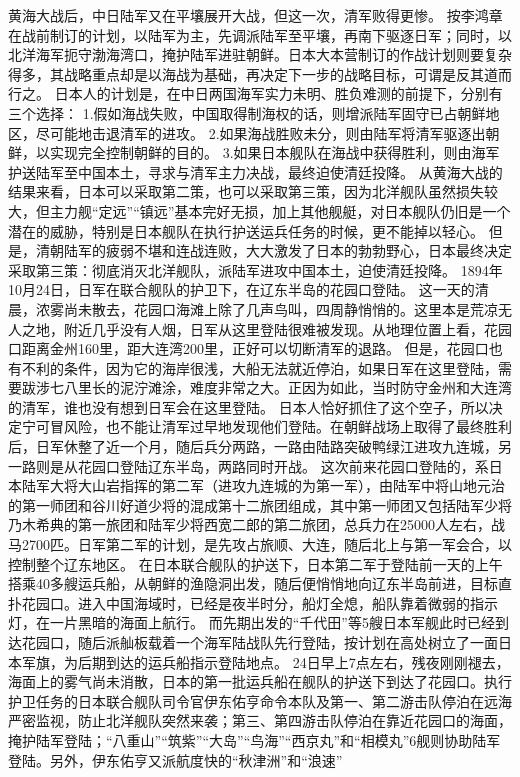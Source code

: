 \documentclass[12pt,UTF8]{ctexbook}
\begin{document}
黄海大战后，中日陆军又在平壤展开大战，但这一次，清军败得更惨。
按李鸿章在战前制订的计划，以陆军为主，先调派陆军至平壤，再南下驱逐日军；同时，以北洋海军扼守渤海湾口，掩护陆军进驻朝鲜。日本大本营制订的作战计划则要复杂得多，其战略重点却是以海战为基础，再决定下一步的战略目标，可谓是反其道而行之。
日本人的计划是，在中日两国海军实力未明、胜负难测的前提下，分别有三个选择：
1.假如海战失败，中国取得制海权的话，则增派陆军固守已占朝鲜地区，尽可能地击退清军的进攻。
2.如果海战胜败未分，则由陆军将清军驱逐出朝鲜，以实现完全控制朝鲜的目的。
3.如果日本舰队在海战中获得胜利，则由海军护送陆军至中国本土，寻求与清军主力决战，最终迫使清廷投降。
从黄海大战的结果来看，日本可以采取第二策，也可以采取第三策，因为北洋舰队虽然损失较大，但主力舰“定远”“镇远”基本完好无损，加上其他舰艇，对日本舰队仍旧是一个潜在的威胁，特别是日本舰队在执行护送运兵任务的时候，更不能掉以轻心。
但是，清朝陆军的疲弱不堪和连战连败，大大激发了日本的勃勃野心，日本最终决定采取第三策：彻底消灭北洋舰队，派陆军进攻中国本土，迫使清廷投降。
1894年10月24日，日军在联合舰队的护卫下，在辽东半岛的花园口登陆。
这一天的清晨，浓雾尚未散去，花园口海滩上除了几声鸟叫，四周静悄悄的。这里本是荒凉无人之地，附近几乎没有人烟，日军从这里登陆很难被发现。从地理位置上看，花园口距离金州160里，距大连湾200里，正好可以切断清军的退路。
但是，花园口也有不利的条件，因为它的海岸很浅，大船无法就近停泊，如果日军在这里登陆，需要跋涉七八里长的泥泞滩涂，难度非常之大。正因为如此，当时防守金州和大连湾的清军，谁也没有想到日军会在这里登陆。
日本人恰好抓住了这个空子，所以决定宁可冒风险，也不能让清军过早地发现他们登陆。在朝鲜战场上取得了最终胜利后，日军休整了近一个月，随后兵分两路，一路由陆路突破鸭绿江进攻九连城，另一路则是从花园口登陆辽东半岛，两路同时开战。
这次前来花园口登陆的，系日本陆军大将大山岩指挥的第二军（进攻九连城的为第一军），由陆军中将山地元治的第一师团和谷川好道少将的混成第十二旅团组成，其中第一师团又包括陆军少将乃木希典的第一旅团和陆军少将西宽二郎的第二旅团，总兵力在25000人左右，战马2700匹。日军第二军的计划，是先攻占旅顺、大连，随后北上与第一军会合，以控制整个辽东地区。
在日本联合舰队的护送下，日本第二军于登陆前一天的上午搭乘40多艘运兵船，从朝鲜的渔隐洞出发，随后便悄悄地向辽东半岛前进，目标直扑花园口。进入中国海域时，已经是夜半时分，船灯全熄，船队靠着微弱的指示灯，在一片黑暗的海面上航行。
而先期出发的“千代田”等5艘日本军舰此时已经到达花园口，随后派舢板载着一个海军陆战队先行登陆，按计划在高处树立了一面日本军旗，为后期到达的运兵船指示登陆地点。
24日早上7点左右，残夜刚刚褪去，海面上的雾气尚未消散，日本的第一批运兵船在舰队的护送下到达了花园口。执行护卫任务的日本联合舰队司令官伊东佑亨命令本队及第一、第二游击队停泊在远海严密监视，防止北洋舰队突然来袭；第三、第四游击队停泊在靠近花园口的海面，掩护陆军登陆；“八重山”“筑紫”“大岛”“鸟海”“西京丸”和“相模丸”6舰则协助陆军登陆。另外，伊东佑亨又派航度快的“秋津洲”和“浪速”
\end{document}
